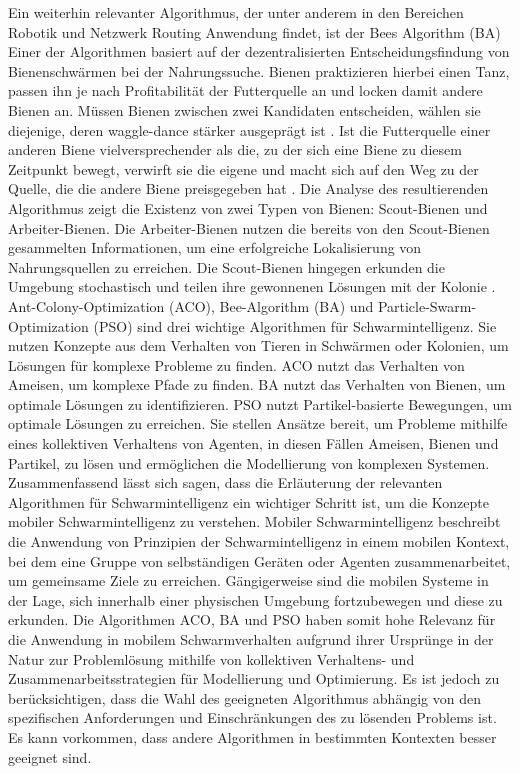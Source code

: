 Ein weiterhin relevanter Algorithmus, der unter anderem in den Bereichen Robotik und Netzwerk Routing Anwendung findet, ist der Bees Algorithm (BA) Einer der Algorithmen basiert auf der dezentralisierten Entscheidungsfindung von Bienenschwärmen bei der Nahrungssuche. Bienen praktizieren hierbei einen Tanz, passen ihn je nach Profitabilität der Futterquelle an und locken damit andere Bienen an. Müssen Bienen zwischen zwei Kandidaten entscheiden, wählen sie diejenige, deren waggle-dance stärker ausgeprägt ist \cite{Panigrahi2011, Yuce2013, Parpinelli2011}. Ist die Futterquelle einer anderen Biene vielversprechender als die, zu der sich eine Biene zu diesem Zeitpunkt bewegt, verwirft sie die eigene und macht sich auf den Weg zu der Quelle, die die andere Biene preisgegeben hat \cite{Bonabeau1999}. Die Analyse des resultierenden Algorithmus zeigt die Existenz von zwei Typen von Bienen: Scout-Bienen und Arbeiter-Bienen. Die Arbeiter-Bienen nutzen die bereits von den Scout-Bienen gesammelten Informationen, um eine erfolgreiche Lokalisierung von Nahrungsquellen zu erreichen. Die Scout-Bienen hingegen erkunden die Umgebung stochastisch und teilen ihre gewonnenen Lösungen mit der Kolonie \cite{Parpinelli2011}. 
Ant-Colony-Optimization (ACO), Bee-Algorithm (BA) und Particle-Swarm-Optimization (PSO) sind drei wichtige Algorithmen für Schwarmintelligenz. Sie nutzen Konzepte aus dem Verhalten von Tieren in Schwärmen oder Kolonien, um Lösungen für komplexe Probleme zu finden. ACO nutzt das Verhalten von Ameisen, um komplexe Pfade zu finden. BA nutzt das Verhalten von Bienen, um optimale Lösungen zu identifizieren. PSO nutzt Partikel-basierte Bewegungen, um optimale Lösungen zu erreichen. Sie stellen Ansätze bereit, um Probleme mithilfe eines kollektiven Verhaltens von Agenten, in diesen Fällen Ameisen, Bienen und Partikel, zu lösen und ermöglichen die Modellierung von komplexen Systemen. 
Zusammenfassend lässt sich sagen, dass die Erläuterung der relevanten Algorithmen für Schwarmintelligenz ein wichtiger Schritt ist, um die Konzepte mobiler Schwarmintelligenz zu verstehen. Mobiler Schwarmintelligenz beschreibt die Anwendung von Prinzipien der Schwarmintelligenz in einem mobilen Kontext, bei dem eine Gruppe von selbständigen Geräten oder Agenten zusammenarbeitet, um gemeinsame Ziele zu erreichen. Gängigerweise sind die mobilen Systeme in der Lage, sich innerhalb einer physischen Umgebung fortzubewegen und diese zu erkunden. Die Algorithmen ACO, BA und PSO haben somit hohe Relevanz für die Anwendung in mobilem Schwarmverhalten aufgrund ihrer Ursprünge in der Natur zur Problemlösung mithilfe von kollektiven Verhaltens- und Zusammenarbeitsstrategien für Modellierung und Optimierung. Es ist jedoch zu berücksichtigen, dass die Wahl des geeigneten Algorithmus abhängig von den spezifischen Anforderungen und Einschränkungen des zu lösenden Problems ist. Es kann vorkommen, dass andere Algorithmen in bestimmten Kontexten besser geeignet sind. 
